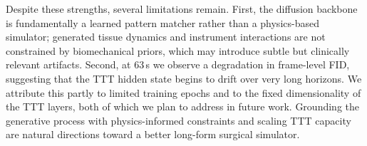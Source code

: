 \documentclass[runningheads]{llncs}
\begin{document}
Despite these strengths, several limitations remain. First, the diffusion backbone is fundamentally a learned pattern matcher rather than a physics-based simulator; generated tissue dynamics and instrument interactions are not constrained by biomechanical priors, which may introduce subtle but clinically relevant artifacts. Second, at 63\,s we observe a degradation in frame-level FID, suggesting that the TTT hidden state begins to drift over very long horizons. We attribute this partly to limited training epochs and to the fixed dimensionality of the TTT layers, both of which we plan to address in future work. Grounding the generative process with physics-informed constraints and scaling TTT capacity are natural directions toward a better long-form surgical simulator.

%
%
%


\end{document}

